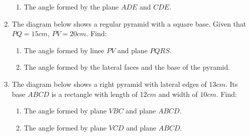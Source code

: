 \documentclass{report}
\begin{document}
\begin{multicols}{2}
\begin{enumerate}
\begin{enumerate}
                  \item The angle formed by the plane $ADE$ and $CDE$.
              \end{enumerate}
        \item The diagram below shows a regular pyramid with a square base. Given that $PQ =
                  15cm$, $PV = 20cm$. Find:
              \begin{enumerate}
                  \item The angle formed by linee $PV$ and plane $PQRS$.
                  \item The angle formed by the lateral faces and the base of the pyramid.
              \end{enumerate}
              \begin{center}
              \end{center}
        \item The diagram below shows a right pyramid with lateral edges of $13cm$. Its base
              $ABCD$ is a rectangle with length of $12cm$ and width of $10cm$. Find:
              \begin{enumerate}
                  \item The angle formed by plane $VBC$ and plane $ABCD$.
                  \item The angle formed by plane $VCD$ and plane $ABCD$.
              \end{enumerate}
              \begin{center}
\end{center}
\end{enumerate}
\end{multicols}
\end{document}
